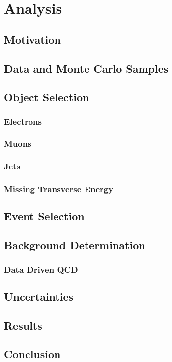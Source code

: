 \chapter{Analysis}
\section{Motivation}
\section{Data and Monte Carlo Samples}
\section{Object Selection}
\subsection{Electrons}
\subsection{Muons}
\subsection{Jets}
\subsection{Missing Transverse Energy}
\section{Event Selection}
\section{Background Determination}
\subsection{Data Driven QCD}
\section{Uncertainties}
\section{Results}
\section{Conclusion}

